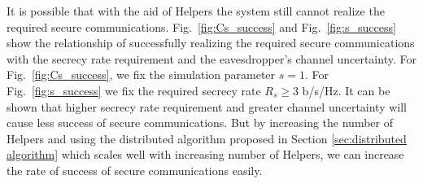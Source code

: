 \documentclass[conference]{IEEEtran}
\begin{document}
It is possible that with the aid of Helpers the system still cannot realize the required secure communications. Fig.~\ref{fig:Cs_success} and Fig.~\ref{fig:s_success} show the relationship of successfully realizing the required secure communications with the secrecy rate requirement and the eavesdropper's channel uncertainty. For Fig.~\ref{fig:Cs_success}, we fix the simulation parameter $s = 1$. For Fig.~\ref{fig:s_success} we fix the required secrecy rate $R_s \geq 3$ b/s/Hz. It can be shown that higher secrecy rate requirement and greater channel uncertainty will cause less success of secure communications. But by increasing the number of Helpers and using the distributed algorithm proposed in Section \ref{sec:distributed algorithm} which scales well with increasing number of Helpers, we can increase the rate of success of secure communications easily. 

%
%

\end{document}
